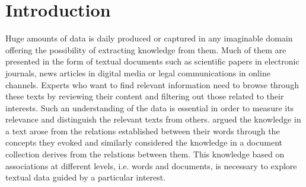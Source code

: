 

\chapter{Introduction}\label{ch:introduction}

\graphicspath{{introduction/figures/}}






Huge amounts of data is daily produced or captured in any imaginable domain offering the possibility of extracting knowledge from them. Much of them are presented in the form of textual documents such as scientific papers in electronic journals, news articles in digital media or 
legal communications in online channels. Experts who want to find relevant information need to browse through these texts by reviewing their content and filtering out those related to their interests. Such an understanding of the data is essential in order to measure its relevance and distinguish the relevant texts from others. \cite{Griffiths2007} argued the knowledge in a text arose from the relations established between their words through the concepts they evoked and similarly \cite{Kenter2015} considered the knowledge in a document collection derives from the relations between them. This knowledge based on associations at different levels, i.e. words and documents, is necessary to explore textual data guided by a particular interest.




